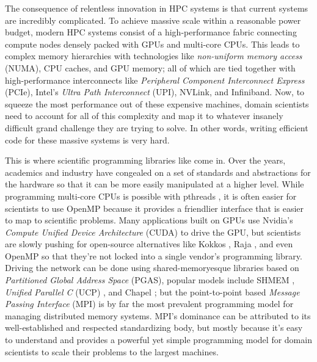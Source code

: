 The consequence of relentless innovation in HPC systems is that current systems are incredibly complicated.
To achieve massive scale within a reasonable power budget, modern HPC systems consist of a high-performance fabric connecting compute nodes densely packed with GPUs and multi-core CPUs.
This leads to complex memory hierarchies with technologies like \textit{non-uniform memory access} (NUMA), CPU caches, and GPU memory; all of which are tied together with high-performance interconnects like \textit{Peripheral Component Interconnect Express} (PCIe), Intel's \textit{Ultra Path Interconnect} (UPI), NVLink, and Infiniband.
Now, to squeeze the most performance out of these expensive machines, domain scientists need to account for all of this complexity and map it to whatever insanely difficult grand challenge they are trying to solve.
In other words, writing efficient code for these massive systems is very hard.

This is where scientific programming libraries like come in.
Over the years, academics and industry have congealed on a set of standards and abstractions for the hardware so that it can be more easily manipulated at a higher level.
While programming multi-core CPUs is possible with pthreads \cite{pthreads}, it is often easier for scientists to use OpenMP \cite{OpenMP} because it provides a friendlier interface that is easier to map to scientific problems.
Many applications built on GPUs use Nvidia's \textit{Compute Unified Device Architecture} (CUDA) \cite{CUDA} to drive the GPU, but scientists are slowly pushing for open-source alternatives like Kokkos \cite{kokkos}, Raja \cite{Raja}, and even OpenMP so that they're not locked into a single vendor's programming library.
Driving the network can be done using shared-memoryesque libraries based on \textit{Partitioned Global Address Space} (PGAS), popular models include SHMEM \cite{OpenSHMEM}, \textit{Unified Parallel C} (UCP) \cite{UPC}, and Chapel \cite{Chapel}; but the point-to-point based \textit{Message Passing Interface} (MPI) \cite{mpi40} is by far the most prevalent programming model for managing distributed memory systems.
MPI's dominance can be attributed to its well-established and respected standardizing body, but mostly because it's easy to understand and provides a powerful yet simple programming model for domain scientists to scale their problems to the largest machines. 

